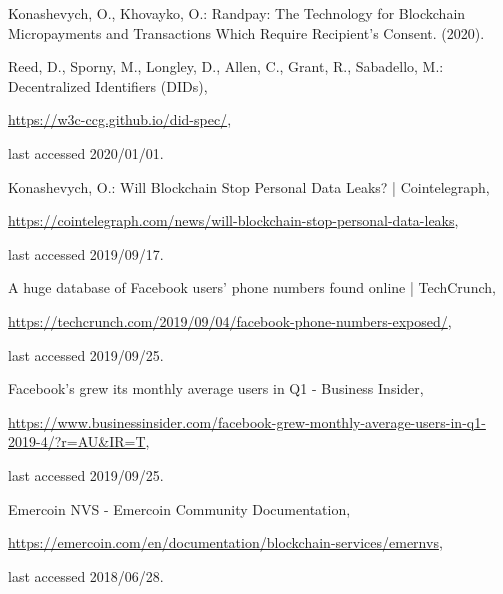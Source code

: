 \begin{multicols}{2}
\begin{thebibliography}{99}
 Konashevych, O., Khovayko, O.: Randpay: The Technology for Blockchain Micropayments and Transactions Which Require Recipient’s Consent. (2020).

 Reed, D., Sporny, M., Longley, D., Allen, C., Grant, R., Sabadello, M.: Decentralized Identifiers (DIDs), 

\url{https://w3c-ccg.github.io/did-spec/},

 last accessed 2020/01/01.

 Konashevych, O.: Will Blockchain Stop Personal Data Leaks? | Cointelegraph, 

\url{https://cointelegraph.com/news/will-blockchain-stop-personal-data-leaks},

last accessed 2019/09/17.

 A huge database of Facebook users’ phone numbers found online | TechCrunch, 

\url{https://techcrunch.com/2019/09/04/facebook-phone-numbers-exposed/}, 

last accessed 2019/09/25.

 Facebook’s grew its monthly average users in Q1 - Business Insider,
 
 \url{https://www.businessinsider.com/facebook-grew-monthly-average-users-in-q1-2019-4/?r=AU\&IR=T},
  
  last accessed 2019/09/25.
  
 Emercoin NVS - Emercoin Community Documentation, 

\url{https://emercoin.com/en/documentation/blockchain-services/emernvs},

last accessed 2018/06/28.

\end{thebibliography}
\end{multicols}








